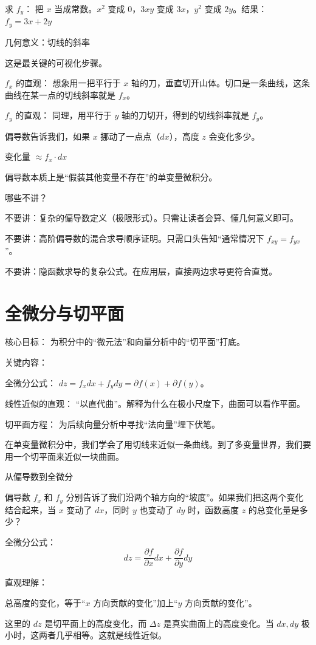 求 $f_y$： 把 $x$ 当成常数。$x^2$ 变成 0，$3xy$ 变成 $3x$，$y^2$ 变成 $2y$。结果：$f_y = 3x + 2y$

几何意义：切线的斜率

这是最关键的可视化步骤。

$f_x$ 的直观： 想象用一把平行于 $x$ 轴的刀，垂直切开山体。切口是一条曲线，这条曲线在某一点的切线斜率就是 $f_x$。

$f_y$ 的直观： 同理，用平行于 $y$ 轴的刀切开，得到的切线斜率就是 $f_y$。

偏导数告诉我们，如果 $x$ 挪动了一点点（$dx$），高度 $z$ 会变化多少。

变化量 $\approx f_x \cdot dx$

偏导数本质上是“假装其他变量不存在”的单变量微积分。

哪些不讲？

不要讲：复杂的偏导数定义（极限形式）。只需让读者会算、懂几何意义即可。

不要讲：高阶偏导数的混合求导顺序证明。只需口头告知“通常情况下 $f_{xy} = f_{yx}$”。

不要讲：隐函数求导的复杂公式。在应用层，直接两边求导更符合直觉。


\section{全微分与切平面}

核心目标： 为积分中的“微元法”和向量分析中的“切平面”打底。

关键内容：

全微分公式： $dz = f_x dx + f_y dy = \partial f(x) + \partial f(y)$。

线性近似的直观： “以直代曲”。解释为什么在极小尺度下，曲面可以看作平面。

切平面方程： 为后续向量分析中寻找“法向量”埋下伏笔。

在单变量微积分中，我们学会了用切线来近似一条曲线。到了多变量世界，我们要用一个切平面来近似一块曲面。

从偏导数到全微分

偏导数 $f_x$ 和 $f_y$ 分别告诉了我们沿两个轴方向的“坡度”。如果我们把这两个变化结合起来，当 $x$ 变动了 $dx$，同时 $y$ 也变动了 $dy$ 时，函数高度 $z$ 的总变化量是多少？

全微分公式：
$$dz = \frac{\partial f}{\partial x}dx + \frac{\partial f}{\partial y}dy$$

直观理解：

总高度的变化，等于“$x$ 方向贡献的变化”加上“$y$ 方向贡献的变化”。

这里的 $dz$ 是切平面上的高度变化，而 $\Delta z$ 是真实曲面上的高度变化。当 $dx, dy$ 极小时，这两者几乎相等。这就是线性近似。

